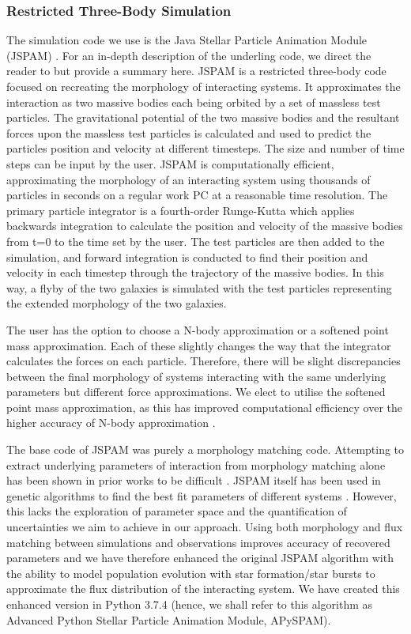 \subsubsection{Restricted Three-Body Simulation}\label{sec:apyspam}
The simulation code we use is the Java Stellar Particle Animation Module (JSPAM) \citep{2016A&C....16...26W}. For an in-depth description of the underling code, we direct the reader to \citet{1990AJ....100.1477W,2016A&C....16...26W} but provide a summary here. JSPAM is a restricted three-body code focused on recreating the morphology of interacting systems. It approximates the interaction as two massive bodies each being orbited by a set of massless test particles. The gravitational potential of the two massive bodies and the resultant forces upon the massless test particles is calculated and used to predict the particles position and velocity at different timesteps. The size and number of time steps can be input by the user. JSPAM is computationally efficient, approximating the morphology of an interacting system using thousands of particles in seconds on a regular work PC at a reasonable time resolution. The primary particle integrator is a fourth-order Runge-Kutta which applies backwards integration to calculate the position and velocity of the massive bodies from t=0 to the time set by the user. The test particles are then added to the simulation, and forward integration is conducted to find their position and velocity in each timestep through the trajectory of the massive bodies. In this way, a flyby of the two galaxies is simulated with the test particles representing the extended morphology of the two galaxies. 

The user has the option to choose a N-body approximation or a softened point mass approximation. Each of these slightly changes the way that the integrator calculates the forces on each particle. Therefore, there will be slight discrepancies between the final morphology of systems interacting with the same underlying parameters but different force approximations. We elect to utilise the softened point mass approximation, as this has improved computational efficiency over the higher accuracy of N-body approximation \citep[for more on this see][]{2016A&C....16...26W}. 

The base code of JSPAM was purely a morphology matching code. Attempting to extract underlying parameters of interaction from morphology matching alone has been shown in prior works to be difficult \citep[e.g.][]{2009AJ....137.3071B}. JSPAM itself has been used in genetic algorithms to find the best fit parameters of different systems \citep[e.g][]{2023A&C....4200691W}. However, this lacks the exploration of parameter space and the quantification of uncertainties we aim to achieve in our approach. Using both morphology and flux matching between simulations and observations improves accuracy of recovered parameters \citep{2021ApJ...923..124M} and we have therefore enhanced the original JSPAM algorithm with the ability to model population evolution with star formation/star bursts to approximate the flux distribution of the interacting system. We have created this enhanced version in Python 3.7.4 (hence, we shall refer to this algorithm as Advanced Python Stellar Particle Animation Module, APySPAM).


